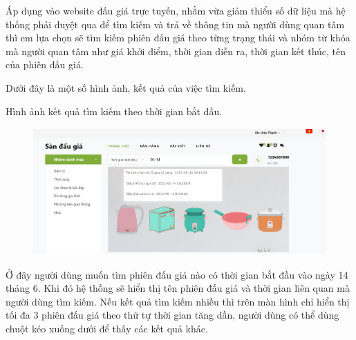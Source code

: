 \documentclass[../DoAn.tex]{subfiles}
\begin{document}
Áp dụng vào website đấu giá trực tuyến, nhằm vừa giảm thiểu số dữ liệu mà hệ thống phải duyệt qua để tìm kiếm và trả về thông tin mà người dùng quan tâm thì em lựa chọn sẽ tìm kiếm phiên đấu giá theo từng trạng thái và nhóm từ khóa mà người quan tâm như giá khởi điểm, thời gian diễn ra, thời gian kết thúc, tên của phiên đấu giá. 

Dưới đây là một số hình ảnh, kết quả của việc tìm kiếm.

Hình ảnh kết quả tìm kiếm theo thời gian bắt đầu.
\begin{figure}[H]
    \centering
    \includegraphics[width=11.4cm,height=4.89cm]{Hinhve/searchstartime.png}
\end{figure}
Ở đây người dùng muốn tìm phiên đấu giá nào có thời gian bắt đầu vào ngày 14 tháng 6. Khi đó hệ thống sẽ hiển thị tên phiên đấu giá và thời gian liên quan mà người dùng tìm kiếm. Nếu kết quả tìm kiếm nhiều thì trên màn hình chỉ hiển thị tối đa 3 phiên đấu giá theo thứ tự thời gian tăng dần, người dùng có thể dùng chuột kéo xuống dưới để thấy các kết quả khác. 
\end{document}

